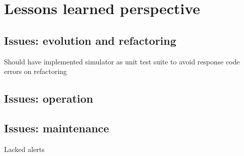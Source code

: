 \section{Lessons learned perspective} \label{section:Lessons learned perspective}
\subsection{Issues: evolution and refactoring}
Should have implemented simulator as unit test suite to avoid response code errors on refactoring
\subsection{Issues: operation}
\subsection{Issues: maintenance}
Lacked alerts